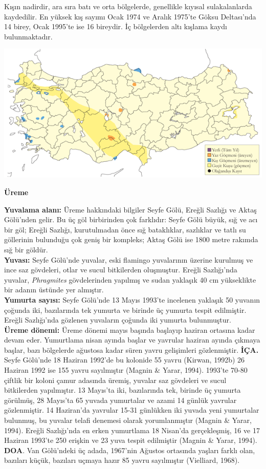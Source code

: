 \documentclass[
  a4paper,
  DIV=11,
  numbers=noendperiod]{scrreprt}
\begin{document}
Kışın nadirdir, ara sıra batı ve orta bölgelerde, genellikle kıyısal
sulakalanlarda kaydedilir. En yüksek kış sayımı Ocak 1974 ve Aralık
1975'te Göksu Deltası'nda 14 birey, Ocak 1995'te ise 16 bireydir. İç
bölgelerden altı kışlama kaydı bulunmaktadır.

\includegraphics{images/harita_Page_073.png}

\textbf{Üreme}

\textbf{Yuvalama alanı:} Üreme hakkındaki bilgiler Seyfe Gölü, Ereğli
Sazlığı ve Aktaş Gölü'nden gelir. Bu üç göl birbirinden çok farklıdır:
Seyfe Gölü büyük, sığ ve acı bir göl; Ereğli Sazlığı, kurutulmadan önce
sığ bataklıklar, sazlıklar ve tatlı su göllerinin bulunduğu çok geniş
bir kompleks; Aktaş Gölü ise 1800 metre rakımda sığ bir göldür.\\
\textbf{Yuvası:} Seyfe Gölü'nde yuvalar, eski flamingo yuvalarının
üzerine kurulmuş ve ince saz gövdeleri, otlar ve sucul bitkilerden
oluşmuştur. Ereğli Sazlığı'nda yuvalar, \emph{Phragmites} gövdelerinden
yapılmış ve sudan yaklaşık 40 cm yükseklikte bir adanın üstünde yer
almıştır.\\
\textbf{Yumurta sayısı:} Seyfe Gölü'nde 13 Mayıs 1993'te incelenen
yaklaşık 50 yuvanın çoğunda iki, bazılarında tek yumurta ve birinde üç
yumurta tespit edilmiştir. Ereğli Sazlığı'nda gözlenen yuvaların çoğunda
iki yumurta bulunmuştur.\\
\textbf{Üreme dönemi:} Üreme dönemi mayıs başında başlayıp haziran
ortasına kadar devam eder. Yumurtlama nisan ayında başlar ve yavrular
haziran ayında çıkmaya başlar, bazı bölgelerde ağustosa kadar süren
yavru gelişimleri gözlenmiştir. \textbf{İÇA.} Seyfe Gölü'nde 18 Haziran
1992'de bu kolonide 55 yavru (Kirwan, 1992b) 26 Haziran 1992 ise 155
yavru sayılmıştır (Magnin \& Yarar, 1994). 1993'te 70-80 çiftlik bir
koloni çamur adasında üremiş, yuvalar saz gövdeleri ve sucul bitkilerden
yapılmıştır. 13 Mayıs'ta iki, bazılarında tek, birinde üç yumurta
görülmüş, 28 Mayıs'ta 65 yuvada yumurtalar ve azami 14 günlük yavrular
gözlenmiştir. 14 Haziran'da yavrular 15-31 günlükken iki yuvada yeni
yumurtalar bulunmuş, bu yuvalar telafi denemesi olarak yorumlanmıştır
(Magnin \& Yarar, 1994). Ereğli Sazlığı'nda en erken yumurtlama 18
Nisan'da gerçekleşmiş, 16 ve 17 Haziran 1993'te 250 erişkin ve 23 yuva
tespit edilmiştir (Magnin \& Yarar, 1994). \textbf{DOA}. Van Gölü'ndeki
üç adada, 1967'nin Ağustos ortasında yaşları farklı olan, bazıları
küçük, bazıları uçmaya hazır 85 yavru sayılmıştır (Vielliard, 1968).
\end{document}
